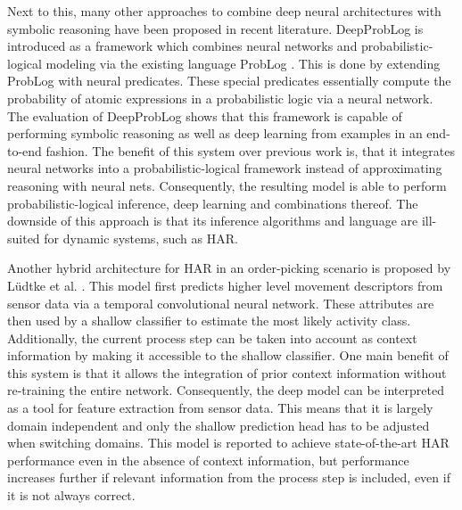\documentclass[11pt,titlepage,oneside,openany]{book}
\begin{document}
Next to this, many other approaches to combine deep neural architectures with symbolic reasoning have been proposed in recent literature. DeepProbLog \cite{manhaeve_deepproblog_2018} is introduced as a framework which combines neural networks and probabilistic-logical modeling via the existing language ProbLog \cite{raedt_problog_nodate}. This is done by extending ProbLog with neural predicates. These special predicates essentially compute the probability of atomic expressions in a probabilistic logic via a neural network. The evaluation of DeepProbLog shows that this framework is capable of performing symbolic reasoning as well as deep learning from examples in an end-to-end fashion. The benefit of this system over previous work is, that it integrates neural networks into a probabilistic-logical framework instead of approximating reasoning with neural nets. Consequently, the resulting model is able to perform probabilistic-logical inference, deep learning and combinations thereof. The downside of this approach is that its inference algorithms and language are ill-suited for dynamic systems, such as HAR.

Another hybrid architecture for HAR in an order-picking scenario is proposed by L\"udtke et al. \cite{ludtke_human_2021}. This model first predicts higher level movement descriptors from sensor data via a temporal convolutional neural network. These attributes are then used by a shallow classifier to estimate the most likely activity class. Additionally, the current process step can be taken into account as context information by making it accessible to the shallow classifier. One main benefit of this system is that it allows the integration of prior context information without re-training the entire network. Consequently, the deep model can be interpreted as a tool for feature extraction from sensor data. This means that it is largely domain independent and only the shallow prediction head has to be adjusted when switching domains. This model is reported to achieve state-of-the-art HAR performance even in the absence of context information, but performance increases further if relevant information from the process step is included, even if it is not always correct.
\end{document}
